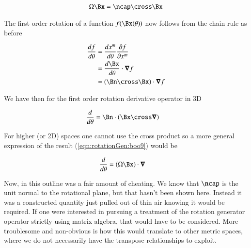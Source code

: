 \begin{align}\label{eqn:rotationGen:boo8}
\Omega \Bx = \ncap \cross \Bx
\end{align}

The first order rotation of a function $f(\Bx(\theta))$ now follows from the chain rule as before

\begin{align*}
\frac{df}{d\theta} 
&= 
\frac{d x^m}{d\theta} 
\frac{\partial f}{\partial x^m} 
\\
&= 
\frac{d \Bx}{d\theta} \cdot \spacegrad f
\\
&= 
(\Bn \cross \Bx) \cdot \spacegrad f
\\
\end{align*}

We have then for the first order rotation derivative operator in 3D

\begin{align}\label{eqn:rotationGen:boo9}
\frac{d}{d\theta} &= \Bn \cdot (\Bx \cross \spacegrad) 
\end{align}

For higher (or 2D) spaces one cannot use the cross product so a more general expression of the result (\ref{eqn:rotationGen:boo9}) would be

\begin{align}\label{eqn:rotationGen:boo10}
\frac{d}{d\theta} &= (\Omega \Bx) \cdot \spacegrad
\end{align}

Now, in this outline was a fair amount of cheating.  We know that $\ncap$ is the unit normal to the rotational plane, but that hasn't been shown here.  Instead it was a constructed quantity just pulled out of thin air knowing it would be required.  If one were interested in pursuing a treatment of the rotation generator operator strictly using matrix algebra, that would have to be considered.  More troublesome and non-obvious is how this would translate to other metric spaces, where we do not necessarily have the transpose relationships to exploit.

\EndArticle
